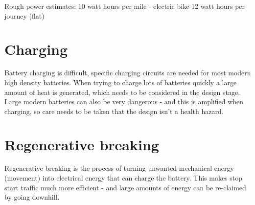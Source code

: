 \documentclass{article}
\begin{document}
Rough power estimates: 
10 watt hours per mile - electric bike
12 watt hours per journey (flat)

\section{Charging}
Battery charging is difficult, specific charging circuits are needed for most modern high density batteries.
When trying to charge lots of batteries quickly a large amount of heat is generated, which needs to be considered in the design stage.
Large modern batteries can also be very dangerous - and this is amplified when charging, so care needs to be taken that the design isn't a health hazard.
\section{Regenerative breaking}
Regenerative breaking is the process of turning unwanted mechanical energy (movement) into electrical energy that can charge the battery. 
This makes stop start traffic much more efficient - and large amounts of energy can be re-claimed by going downhill.
\end{document}
